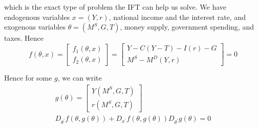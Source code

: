 \documentclass{article}
\theoremstyle{mythm}
\theoremstyle{mydef}
\begin{document}
which is the exact type of problem the IFT can help us solve. We have endogenous variables $x = (Y, r)$, national income and the interest rate, and exogenous variables $\theta = (M^S, G, T)$, money supply, government spending, and taxes. Hence
\begin{equation}
 \label{eq:is_lm_example}
  f(\theta, x)
  =
  \left[\begin{matrix}
    f_1(\theta, x) \\
    f_2(\theta, x)
  \end{matrix}\right]
  =
  \left[\begin{matrix}
    Y - C(Y - T) - I(r) - G \\
    M^S - M^D (Y, r)
  \end{matrix}\right]
  = 0
\end{equation}

Hence for some $g$, we can write
\begin{equation}
  \begin{array}{c}
    g(\theta)
    = \left[\begin{matrix}
      Y(M^S, G, T) \\
      r(M^S, G, T)
    \end{matrix}\right] \\[6pt]
    D_{\theta^\prime} f(\theta, g(\theta)) + D_{x^\prime} f(\theta, g(\theta)) D_{\theta^\prime} g(\theta) = 0
  \end{array}
  \nonumber
\end{equation}
\end{document}
